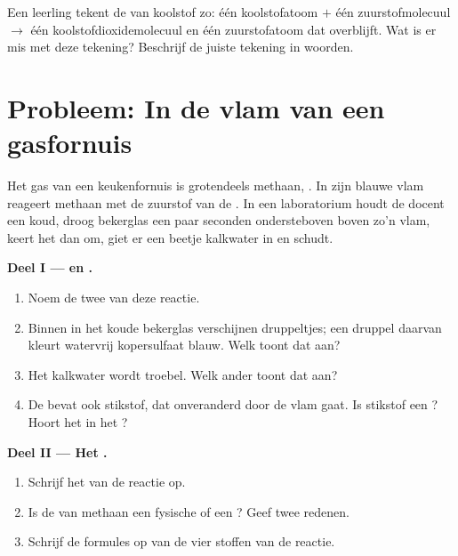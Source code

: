 \begin{exercise}[$\star\star\star$]\label{exo:g7:chemical-reactions:12}
Een leerling tekent de  van koolstof zo: één koolstofatoom
$+$ één zuurstofmolecuul $\longrightarrow$ één koolstofdioxidemolecuul
en één zuurstofatoom dat overblijft. Wat is er mis met deze tekening?
Beschrijf de juiste tekening in woorden.
\end{exercise}

\section{Probleem: In de vlam van een gasfornuis}

\begin{problem}
\label{pb:g7:chemical-reactions:1}
Het gas van een keukenfornuis is grotendeels methaan, . In zijn
blauwe vlam reageert methaan met de zuurstof van de . In een
laboratorium houdt de docent een koud, droog bekerglas een paar seconden
ondersteboven boven zo'n vlam, keert het dan om, giet er een beetje
kalkwater in en schudt.

\medskip
\noindent\textbf{Deel I ---  en .}
\begin{enumerate}
  \item Noem de twee  van deze reactie.
  \item Binnen in het koude bekerglas verschijnen druppeltjes; een
        druppel daarvan kleurt watervrij kopersulfaat blauw. Welk
         toont dat aan?
  \item Het kalkwater wordt troebel. Welk ander  toont dat
        aan?
  \item De  bevat ook stikstof, dat onveranderd door de vlam gaat.
        Is stikstof een ? Hoort het in het ?
\end{enumerate}

\medskip
\noindent\textbf{Deel II --- Het .}
\begin{enumerate}[resume]
  \item Schrijf het  van de reactie op.
  \item Is de  van methaan een fysische of een ? Geef twee redenen.
  \item Schrijf de formules op van de vier stoffen van de reactie.
\end{enumerate}


\end{problem}
